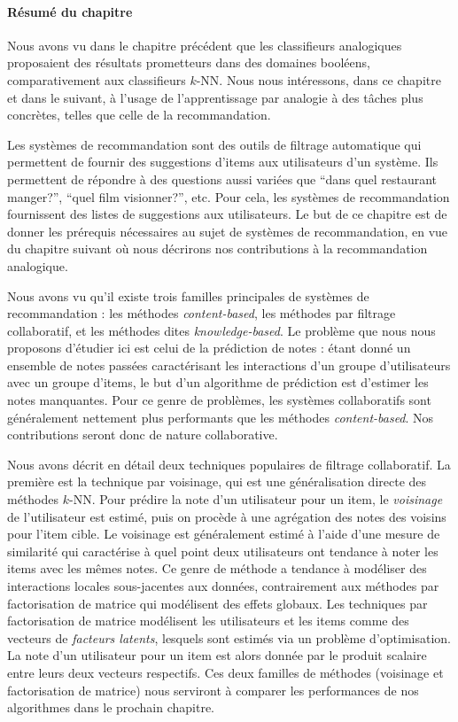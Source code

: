 \paragraph{Résumé du chapitre}

Nous avons vu dans le chapitre précédent que les classifieurs analogiques
proposaient des résultats prometteurs dans des domaines booléens,
comparativement aux classifieurs $k$-NN. Nous nous intéressons, dans ce
chapitre et dans le suivant, à l'usage de l'apprentissage par analogie à des
tâches plus concrètes, telles que celle de la recommandation.

Les systèmes de recommandation sont des outils de filtrage automatique qui
permettent de fournir des suggestions d'items aux utilisateurs d'un système.
Ils permettent de répondre à des questions aussi variées que ``dans quel
restaurant manger?'', ``quel film visionner?'', etc. Pour cela, les systèmes de
recommandation fournissent des listes de suggestions aux utilisateurs.
Le but de ce chapitre est de donner les prérequis nécessaires au sujet de
systèmes de recommandation, en vue du chapitre suivant où nous décrirons nos
contributions à la recommandation analogique.

Nous avons vu qu'il existe trois familles principales de systèmes de
recommandation : les méthodes \textit{content-based}, les méthodes par filtrage
collaboratif, et les méthodes dites \textit{knowledge-based}. Le problème que
nous nous proposons d'étudier ici est celui de la prédiction de notes : étant
donné un ensemble de notes passées caractérisant les interactions d'un groupe
d'utilisateurs avec un groupe d'items, le but d'un algorithme de prédiction est
d'estimer les notes manquantes. Pour ce genre de problèmes, les systèmes
collaboratifs sont généralement nettement plus performants que les méthodes
\textit{content-based}. Nos contributions seront donc de nature collaborative.

Nous avons décrit en détail deux techniques populaires de filtrage
collaboratif. La première est la technique par voisinage, qui est une
généralisation directe des méthodes $k$-NN. Pour prédire la note d'un
utilisateur pour un item, le \textit{voisinage} de l'utilisateur est estimé,
puis on procède à une agrégation des notes des voisins pour l'item cible. Le
voisinage est généralement estimé à l'aide d'une mesure de similarité qui
caractérise à quel point deux utilisateurs ont tendance à noter les items avec
les mêmes notes. Ce genre de méthode a tendance à  modéliser des interactions
locales sous-jacentes aux données, contrairement aux méthodes par factorisation
de matrice qui modélisent des effets globaux. Les techniques par factorisation
de matrice modélisent les utilisateurs et les items comme des vecteurs de
\textit{facteurs latents}, lesquels sont estimés via un problème
d'optimisation. La note d'un utilisateur pour un item est alors donnée par le
produit scalaire entre leurs deux vecteurs respectifs. Ces deux familles de
méthodes (voisinage et factorisation de matrice) nous serviront à comparer les
performances de nos algorithmes dans le prochain chapitre.
